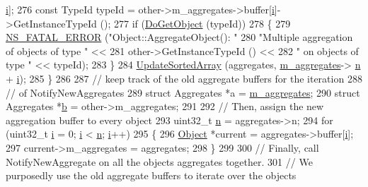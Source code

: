 \begin{DoxyCode}
      \hyperlink{bernuolliDistribution_8m_a6f6ccfcf58b31cb6412107d9d5281426}{i}];
276       \textcolor{keyword}{const} TypeId typeId = other->m\_aggregates->buffer[\hyperlink{bernuolliDistribution_8m_a6f6ccfcf58b31cb6412107d9d5281426}{i}]->GetInstanceTypeId ();
277       \textcolor{keywordflow}{if} (\hyperlink{classns3_1_1Object_a3ee161b5ced0991bcb0a7aef2f6645f1}{DoGetObject} (typeId))
278         \{
279           \hyperlink{group__fatal_ga5131d5e3f75d7d4cbfd706ac456fdc85}{NS\_FATAL\_ERROR} (\textcolor{stringliteral}{"Object::AggregateObject(): "}
280                           \textcolor{stringliteral}{"Multiple aggregation of objects of type "} <<
281                           other->GetInstanceTypeId () <<
282                           \textcolor{stringliteral}{" on objects of type "} << typeId);
283         \}
284       \hyperlink{classns3_1_1Object_adb379c50ccca82c52a2973be4722be84}{UpdateSortedArray} (aggregates, \hyperlink{classns3_1_1Object_a1f0aff511aa8bbed3f3c3dc9b1d41fe4}{m\_aggregates}->
      \hyperlink{structns3_1_1Object_1_1Aggregates_a3157f15eafcbf5f0ec5c85d390853829}{n} + \hyperlink{bernuolliDistribution_8m_a6f6ccfcf58b31cb6412107d9d5281426}{i});
285     \}
286 
287   \textcolor{comment}{// keep track of the old aggregate buffers for the iteration}
288   \textcolor{comment}{// of NotifyNewAggregates}
289   \textcolor{keyword}{struct }Aggregates *a = \hyperlink{classns3_1_1Object_a1f0aff511aa8bbed3f3c3dc9b1d41fe4}{m\_aggregates};
290   \textcolor{keyword}{struct }Aggregates *\hyperlink{buildings__pathloss_8m_a21ad0bd836b90d08f4cf640b4c298e7c}{b} = other->m\_aggregates;
291 
292   \textcolor{comment}{// Then, assign the new aggregation buffer to every object}
293   uint32\_t \hyperlink{namespacesample-rng-plot_aeb5ee5c431e338ef39b7ac5431242e1d}{n} = aggregates->n;
294   \textcolor{keywordflow}{for} (uint32\_t \hyperlink{bernuolliDistribution_8m_a6f6ccfcf58b31cb6412107d9d5281426}{i} = 0; \hyperlink{bernuolliDistribution_8m_a6f6ccfcf58b31cb6412107d9d5281426}{i} < \hyperlink{namespacesample-rng-plot_aeb5ee5c431e338ef39b7ac5431242e1d}{n}; \hyperlink{bernuolliDistribution_8m_a6f6ccfcf58b31cb6412107d9d5281426}{i}++)
295     \{
296       \hyperlink{classns3_1_1Object_a40860402e64d8008fb42329df7097cdb}{Object} *current = aggregates->buffer[\hyperlink{bernuolliDistribution_8m_a6f6ccfcf58b31cb6412107d9d5281426}{i}];
297       current->m\_aggregates = aggregates;
298     \}
299 
300   \textcolor{comment}{// Finally, call NotifyNewAggregate on all the objects aggregates together.}
301   \textcolor{comment}{// We purposedly use the old aggregate buffers to iterate over the objects}

\end{DoxyCode}
